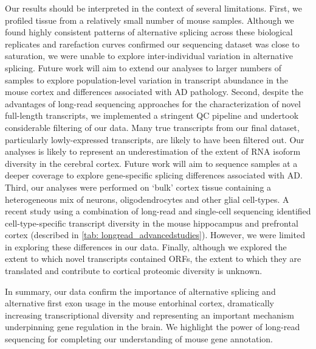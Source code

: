 Our results should be interpreted in the context of several limitations. First, we profiled tissue from a relatively small number of mouse samples. Although we found highly consistent patterns of alternative splicing across these biological replicates and rarefaction curves confirmed our sequencing dataset was close to saturation, we were unable to explore inter-individual variation in alternative splicing. Future work will aim to extend our analyses to larger numbers of samples to explore population-level variation in transcript abundance in the mouse cortex and differences associated with AD pathology. Second, despite the advantages of long-read sequencing approaches for the characterization of novel full-length transcripts, we implemented a stringent QC pipeline and undertook considerable filtering of our data. Many true transcripts from our final dataset, particularly lowly-expressed transcripts, are likely to have been filtered out. Our analyses is likely to represent an underestimation of the extent of RNA isoform diversity in the cerebral cortex. Future work will aim to sequence samples at a deeper coverage to explore gene-specific splicing differences associated with AD. Third, our analyses were performed on ‘bulk’ cortex tissue containing a heterogeneous mix of neurons, oligodendrocytes and other glial cell-types. A recent study using a combination of long-read and single-cell sequencing identified cell-type-specific transcript diversity in the mouse hippocampus and prefrontal cortex\cite{Joglekar2021} (described in \cref{tab: longread_advancedstudies}). However, we were limited in exploring these differences in our data. Finally, although we explored the extent to which novel transcripts contained ORFs, the extent to which they are translated and contribute to cortical proteomic diversity is unknown.  

In summary, our data confirm the importance of alternative splicing and alternative first exon usage in the mouse entorhinal cortex, dramatically increasing transcriptional diversity and representing an important mechanism underpinning gene regulation in the brain. We highlight the power of long-read sequencing for completing our understanding of mouse gene annotation.







